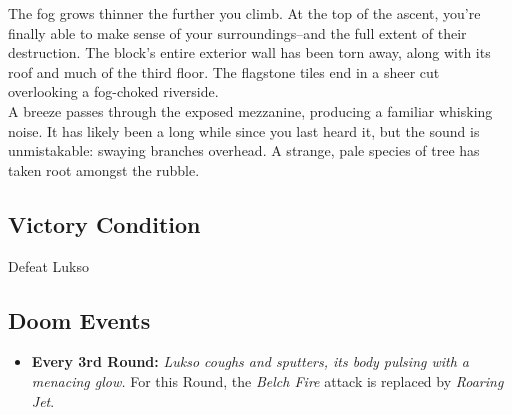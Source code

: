 The fog grows thinner the further you climb. At the top of the ascent, you’re finally able to make sense of your surroundings--and the full extent of their destruction. The block's entire exterior wall has been torn away, along with its roof and much of the third floor. The flagstone tiles end in a sheer cut overlooking a fog-choked riverside.\\

A breeze passes through the exposed mezzanine, producing a familiar whisking noise. It has likely been a long while since you last heard it, but the sound is unmistakable: swaying branches overhead. A strange, pale species of tree has taken root amongst the rubble.\\




\subsection*{Victory Condition}
Defeat Lukso

\begin{tcolorbox}
\subsection*{Doom Events}
\begin{itemize}
\item \textbf{Every 3rd Round:} \emph{Lukso coughs and sputters, its body pulsing with a menacing glow.} For this Round, the \emph{Belch Fire} attack is replaced by \emph{Roaring Jet}.
\end{itemize}
\end{tcolorbox}

